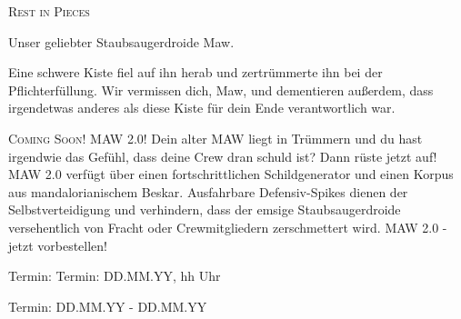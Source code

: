 \documentclass[final]{multiversum}
\begin{document}
\textsc{Rest in Pieces}
\begin{center}Unser geliebter Staubsaugerdroide Maw.\end{center} Eine schwere Kiste fiel auf ihn herab und zertrümmerte ihn bei der Pflichterfüllung.
Wir vermissen dich, Maw, und dementieren außerdem, dass irgendetwas anderes als diese Kiste für dein Ende verantwortlich war. 

\textsc{Coming Soon! MAW 2.0!}
Dein alter MAW liegt in Trümmern und du hast irgendwie das Gefühl, dass deine Crew dran schuld ist? 
Dann rüste jetzt auf! MAW 2.0 verfügt über einen fortschrittlichen Schildgenerator und einen Korpus aus mandalorianischem Beskar. Ausfahrbare Defensiv-Spikes dienen der Selbstverteidigung und verhindern, dass der emsige Staubsaugerdroide versehentlich von Fracht oder Crewmitgliedern zerschmettert wird. 
MAW 2.0 - jetzt vorbestellen!


\begin{termine}
\item Termin: Termin: DD.MM.YY, hh Uhr
  \item Termin: DD.MM.YY - DD.MM.YY
\end{termine}
\impressum
\end{document}
